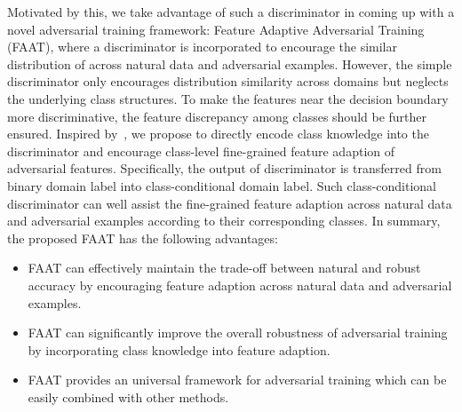 \documentclass[10pt,twocolumn,letterpaper]{article}
\begin{document}
Motivated by this, we take advantage of such a discriminator in coming up with a novel adversarial training framework: Feature Adaptive Adversarial Training (FAAT), where a discriminator is incorporated to encourage the similar distribution of across natural data and adversarial examples. However, the simple discriminator only encourages distribution similarity across domains but neglects the underlying class structures. To make the features near the decision boundary more discriminative, the feature discrepancy among classes should be further ensured. Inspired by~\cite{Haoran_2020_ECCV}, we propose to directly encode class knowledge into the discriminator and encourage class-level fine-grained feature adaption of adversarial features. Specifically, the output of discriminator is transferred from binary domain label into class-conditional domain label. Such class-conditional discriminator can well assist the fine-grained feature adaption across natural data and adversarial examples according to their corresponding classes. 
In summary, the proposed FAAT has the following advantages:
\begin{itemize}
    \item FAAT can effectively maintain the trade-off between natural and robust accuracy by encouraging feature adaption across natural data and adversarial examples.
    \item FAAT can significantly improve the overall robustness of adversarial training by incorporating class knowledge into feature adaption.
    \item FAAT provides an universal framework for adversarial training which can be easily combined with other methods.
\end{itemize}


\end{document}

